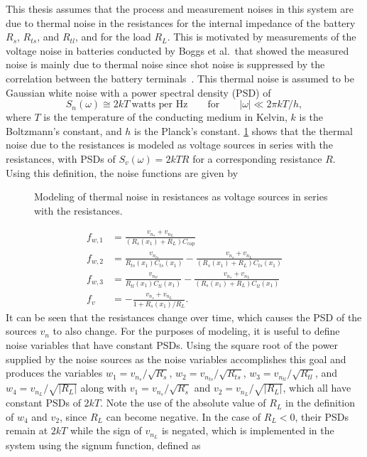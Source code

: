 \documentclass[../zhang_thesis.tex]{subfiles}
\begin{document}
This thesis assumes that the process and measurement noises in this system are due to thermal noise in the resistances for the internal impedance of the battery $R_s$, $R_{ts}$, and $R_{tl}$, and for the load $R_L$. This is motivated by measurements of the voltage noise in batteries conducted by Boggs et al.\ that showed the measured noise is mainly due to thermal noise since shot noise is suppressed by the correlation between the battery terminals~\cite{boggs95}. This thermal noise
is assumed to be Gaussian white noise with a power spectral density (PSD) of~\cite{stremler82}
\begin{equation}
    S_n(\omega) \cong 2kT\ \text{watts per Hz} \qquad \text{for} \qquad |\omega| \ll 2\pi kT/h,
\end{equation}
where $T$ is the temperature of the conducting medium in Kelvin, $k$ is the Boltzmann's constant, and $h$ is the Planck's constant. \cref{fig:batt_noisy} shows that the thermal noise due to the resistances is modeled as voltage sources in series with the resistances, with PSDs of $S_v(\omega)=2kTR$ for a corresponding resistance $R$. Using this definition, the noise functions are given by
\begin{figure}[b]

\caption{Modeling of thermal noise in resistances as voltage sources in series with the resistances.}
\label{fig:batt_noisy}
\end{figure}
\begin{align}
    f_{w,1} &= \frac{v_{n_s}+v_{n_L}}{(R_s(x_1)+R_L)C_\text{cap}} \\
    f_{w,2} &= \frac{v_{n_{ts}}}{R_{ts}(x_1)C_{ts}(x_1)} - \frac{v_{n_s}+v_{n_L}}{(R_s(x_1)+R_L)C_{ts}(x_1)} \\
    f_{w,3} &= \frac{v_{n_{tl}}}{R_{tl}(x_1)C_{tl}(x_1)} - \frac{v_{n_s}+v_{n_L}}{(R_s(x_1)+R_L)C_{tl}(x_1)} \\
    f_v &= - \frac{v_{n_s}+v_{n_L}}{1+R_s(x_1)/R_L}.
\end{align}
It can be seen that the resistances change over time, which causes the PSD of the sources $v_n$ to also change. For the purposes of modeling, it is useful to define noise variables that have constant PSDs. Using the square root of the power supplied by the noise sources as the noise variables accomplishes this goal and produces the variables $w_1=v_{n_s}/\sqrt{R_s}$, $w_2=v_{n_{ts}}/\sqrt{R_{ts}}$, $w_3=v_{n_{tl}}/\sqrt{R_{tl}}$, and $w_4=v_{n_L}/\sqrt{|R_L|}$ along with
$v_1=v_{n_s}/\sqrt{R_s}$ and $v_2=v_{n_L}/\sqrt{|R_L|}$, which all have
constant PSDs of $2kT$. Note the use of the absolute value of $R_L$ in the definition of $w_4$ and $v_2$, since $R_L$ can become negative. In the case of $R_L<0$, their PSDs remain at $2kT$ while the sign of $v_{n_L}$ is negated, which is implemented in the system using the signum function, defined as
\end{document}
